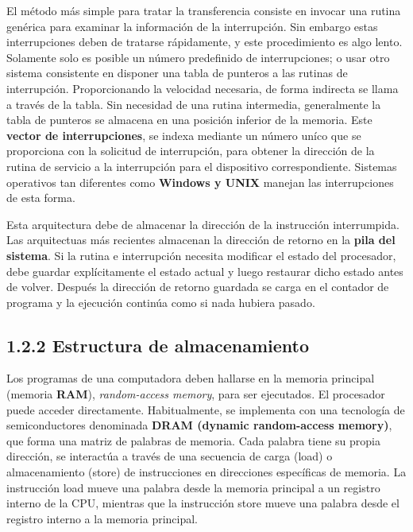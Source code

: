 \documentclass{article}
\begin{document}
El m\'{e}todo m\'{a}s simple para tratar la transferencia consiste en invocar una rutina
gen\'{e}rica para examinar la informaci\'{o}n de la interrupci\'{o}n. Sin embargo estas
interrupciones deben de tratarse r\'{a}pidamente, y este procedimiento es algo lento. 
Solamente solo es posible un n\'{u}mero predefinido de interrupciones; o usar otro sistema
consistente en disponer una tabla de punteros a las rutinas de interrupci\'{o}n. Proporcionando
la velocidad necesaria, de forma indirecta se llama a trav\'{e}s de la tabla. Sin necesidad
de una rutina intermedia, generalmente la tabla de punteros se almacena en una posici\'{o}n
inferior de la memoria. Este \textbf{vector de interrupciones}, se indexa mediante un n\'{u}mero 
un\'{i}co que se proporciona con la solicitud de interrupci\'{o}n, para obtener la
direcci\'{o}n de la rutina de servicio a la interrupci\'{o}n para el dispositivo correspondiente.
Sistemas operativos tan diferentes como \textbf{Windows y UNIX} manejan las interrupciones
de esta forma.

Esta arquitectura debe de almacenar la direcci\'{o}n de la instrucci\'{o}n interrumpida.
Las arquitectuas m\'{a}s recientes almacenan la direcci\'{o}n de retorno en la \textbf{pila del
sistema}. Si la rutina e interrupci\'{o}n necesita modificar el estado del procesador,
debe guardar expl\'{i}citamente el estado actual y luego restaurar dicho estado antes
de volver. Despu\'{e}s la direcci\'{o}n de retorno guardada se carga en el contador de
programa y la ejecuci\'{o}n contin\'{u}a como si nada hubiera pasado.

\subsection*{1.2.2 Estructura de almacenamiento}
Los programas de una computadora deben hallarse en la memoria principal (memoria \textbf{RAM}),
\textit{random-access memory}, para ser ejecutados. El procesador puede acceder directamente.
Habitualmente, se implementa con una tecnolog\'{i}a de semiconductores denominada \textbf{DRAM 
(dynamic random-access memory)}, que forma una matriz de palabras de memoria. Cada palabra tiene
su propia direcci\'{o}n, se interact\'{u}a a trav\'{e}s de una secuencia de carga (load) o 
almacenamiento (store) de instrucciones en direcciones espec\'{i}ficas de memoria. La instrucci\'{o}n
load mueve una palabra desde la memoria principal a un registro interno de la CPU, mientras
que la instrucci\'{o}n store mueve una palabra desde el registro interno a la memoria principal.
\end{document}

